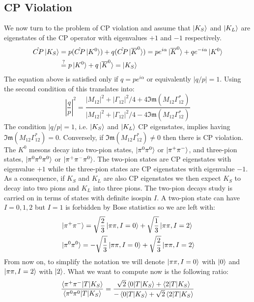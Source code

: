 \documentclass[../main.tex]{subfiles}
\begin{document}
\subsection{CP Violation}
We now turn to the problem of CP violation and assume that $\ket{K_S}$ and $\ket{K_L}$ are eigenstates of the CP operator with eigenvalues $+1$ and $-1$ respectively.
\begin{align*}
\hat{CP}\ket{K_S}&=p(\hat{CP}\ket{K^0})+q(\hat{CP}\ket{\overline{K}^0})=pe^{i\alpha}\ket{\overline{K}^0}+qe^{-i\alpha}\ket{K^0}\\
&\stackrel{?}{=}p\ket{K^0}+q\ket{\overline{K}^0}=\ket{K_S}
\end{align*}
The equation above is satisfied only if $q=pe^{i\alpha}$ or equivalently $|q/p|=1$. Using the second condition of  this translates into:
\[
\left|\frac{q}{p}\right|^2=\frac{|M_{12}|^2+|\Gamma_{12}|^2/4+4\mathfrak{Im}(M_{12}\Gamma_{12}^*)}{|M_{12}|^2+|\Gamma_{12}|^2/4-4\mathfrak{Im}(M_{12}\Gamma_{12}^*)}
\]
The condition $|q/p|=1$, i.e. $\ket{K_S}$ and $\ket{K_L}$ CP eigenstates, implies having $\mathfrak{Im}(M_{12}\Gamma_{12}^*)=0$. Conversely, if $\mathfrak{Im}(M_{12}\Gamma_{12}^*)\neq0$ then there is CP violation.\\
The $K^0$ mesons decay into two-pion states, $\ket{\pi^0\pi^0}$ or $\ket{\pi^+\pi^-}$, and three-pion states, $\ket{\pi^0\pi^0\pi^0}$ or $\ket{\pi^+\pi^-\pi^0}$. The two-pion states are CP eigenstates with eigenvalue $+1$ while the three-pion states are CP eigenstates with eigenvalue $-1$. As a consequence, if $K_S$ and $K_L$ are also CP eigenstates we then expect $K_S$ to decay into two pions and $K_L$ into three pions. The two-pion decays study is carried on in terms of states with definite isospin $I$. A two-pion state can have $I=0,1,2$  but $I=1$ is forbidden by Bose statistics so we are left with:
\[
\begin{aligned}
&\ket{\pi^+\pi^-}=\sqrt{\frac{2}{3}}\ket{\pi\pi,I=0}+\sqrt{\frac{1}{3}}\ket{\pi\pi,I=2}\\
&\ket{\pi^0\pi^0}=-\sqrt{\frac{1}{3}}\ket{\pi\pi,I=0}+\sqrt{\frac{2}{3}}\ket{\pi\pi,I=2}
\end{aligned}
\]
From now on, to simplify the notation we will denote $\ket{\pi\pi,I=0}$ with $\ket{0}$ and $\ket{\pi\pi,I=2}$ with $\ket{2}$. What we want to compute now is the following ratio:
\[
\frac{\braket{\pi^+\pi^-|T|K_S}}{\braket{\pi^0\pi^0|T|K_S}}=\frac{\sqrt{2}\braket{0|T|K_S}+\braket{2|T|K_S}}{-\braket{0|T|K_S}+\sqrt{2}\braket{2|T|K_S}}
\]
\end{document}
